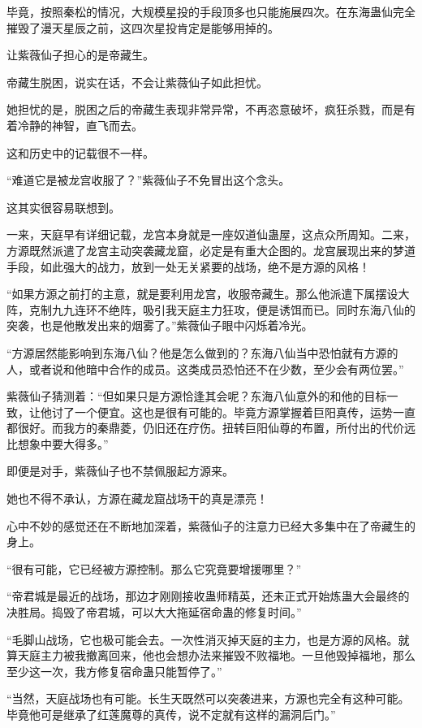 \begin{this_body}
毕竟，按照秦松的情况，大规模星投的手段顶多也只能施展四次。在东海蛊仙完全摧毁了漫天星辰之前，这四次星投肯定是能够用掉的。

让紫薇仙子担心的是帝藏生。

帝藏生脱困，说实在话，不会让紫薇仙子如此担忧。

她担忧的是，脱困之后的帝藏生表现非常异常，不再恣意破坏，疯狂杀戮，而是有着冷静的神智，直飞而去。

这和历史中的记载很不一样。

“难道它是被龙宫收服了？”紫薇仙子不免冒出这个念头。

这其实很容易联想到。

一来，天庭早有详细记载，龙宫本身就是一座奴道仙蛊屋，这点众所周知。二来，方源既然派遣了龙宫主动突袭藏龙窟，必定是有重大企图的。龙宫展现出来的梦道手段，如此强大的战力，放到一处无关紧要的战场，绝不是方源的风格！

“如果方源之前打的主意，就是要利用龙宫，收服帝藏生。那么他派遣下属摆设大阵，克制九九连环不绝阵，吸引我天庭主力狂攻，便是诱饵而已。同时东海八仙的突袭，也是他散发出来的烟雾了。”紫薇仙子眼中闪烁着冷光。

“方源居然能影响到东海八仙？他是怎么做到的？东海八仙当中恐怕就有方源的人，或者说和他暗中合作的成员。这类成员恐怕还不在少数，至少会有两位罢。”

紫薇仙子猜测着：“但如果只是方源恰逢其会呢？东海八仙意外的和他的目标一致，让他讨了一个便宜。这也是很有可能的。毕竟方源掌握着巨阳真传，运势一直都很好。而我方的秦鼎菱，仍旧还在疗伤。扭转巨阳仙尊的布置，所付出的代价远比想象中要大得多。”

即便是对手，紫薇仙子也不禁佩服起方源来。

她也不得不承认，方源在藏龙窟战场干的真是漂亮！

心中不妙的感觉还在不断地加深着，紫薇仙子的注意力已经大多集中在了帝藏生的身上。

“很有可能，它已经被方源控制。那么它究竟要增援哪里？”

“帝君城是最近的战场，那边才刚刚接收蛊师精英，还未正式开始炼蛊大会最终的决胜局。捣毁了帝君城，可以大大拖延宿命蛊的修复时间。”

“毛脚山战场，它也极可能会去。一次性消灭掉天庭的主力，也是方源的风格。就算天庭主力被我撤离回来，他也会想办法来摧毁不败福地。一旦他毁掉福地，那么至少这一次，我方修复宿命蛊只能暂停了。”

“当然，天庭战场也有可能。长生天既然可以突袭进来，方源也完全有这种可能。毕竟他可是继承了红莲魔尊的真传，说不定就有这样的漏洞后门。”


\end{this_body}
